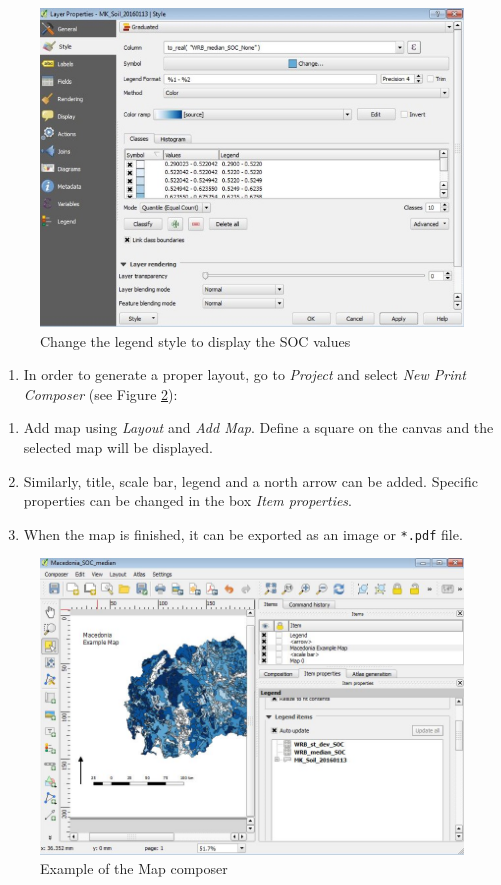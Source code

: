 \documentclass[10pt,b5paper,]{book}
\providecommand{\tightlist}{%
  \setlength{\itemsep}{0pt}\setlength{\parskip}{0pt}}
\theoremstyle{definition}
\theoremstyle{definition}
\theoremstyle{definition}
\theoremstyle{remark}
\begin{document}
\begin{figure}

{\centering \includegraphics[width=0.8\linewidth]{images/Conv_upscaling7} 

}

\caption{Change the legend style to display the SOC values}\label{fig:legendstyle}
\end{figure}

\begin{enumerate}
\def\labelenumi{\arabic{enumi}.}
\setcounter{enumi}{8}
\tightlist
\item
  In order to generate a proper layout, go to \emph{Project} and select
  \emph{New Print Composer} (see Figure \ref{fig:mapcomp}):
\end{enumerate}

\begin{enumerate}
\def\labelenumi{\alph{enumi}.}
\tightlist
\item
  Add map using \emph{Layout} and \emph{Add Map}. Define a square on the
  canvas and the selected map will be displayed.
\item
  Similarly, title, scale bar, legend and a north arrow can be added.
  Specific properties can be changed in the box \emph{Item properties}.
\item
  When the map is finished, it can be exported as an image or
  \texttt{*.pdf} file.
\end{enumerate}

\begin{figure}

{\centering \includegraphics[width=0.8\linewidth]{images/Conv_upscaling8} 

}

\caption{Example of the Map composer}\label{fig:mapcomp}
\end{figure}
\end{document}
